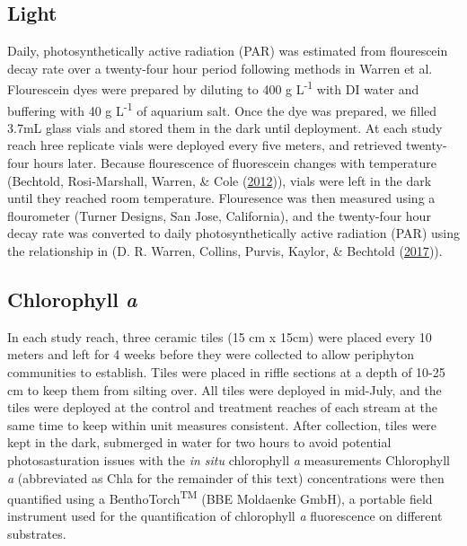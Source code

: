\documentclass[double,12pt]{beavtex}
\begin{document}
  \subsection*{Light}\label{light}
  
  Daily, photosynthetically active radiation (PAR) was estimated from
  flourescein decay rate over a twenty-four hour period following methods
  in Warren et al. Flourescein dyes were prepared by diluting to 400 g
  L\textsuperscript{-1} with DI water and buffering with 40 g
  L\textsuperscript{-1} of aquarium salt. Once the dye was prepared, we
  filled 3.7mL glass vials and stored them in the dark until deployment.
  At each study reach hree replicate vials were deployed every five
  meters, and retrieved twenty-four hours later. Because flourescence of
  fluorescein changes with temperature (Bechtold, Rosi-Marshall, Warren,
  \& Cole (\protect\hyperlink{ref-Bechtold2012}{2012})), vials were left
  in the dark until they reached room temperature. Flouresence was then
  measured using a flourometer (Turner Designs, San Jose, California), and
  the twenty-four hour decay rate was converted to daily
  photosynthetically active radiation (PAR) using the relationship in (D.
  R. Warren, Collins, Purvis, Kaylor, \& Bechtold
  (\protect\hyperlink{ref-Warren2017}{2017})).
  
  \subsection*{\texorpdfstring{Chlorophyll
  \emph{a}}{Chlorophyll a}}\label{chlorophyll-a}
  
  In each study reach, three ceramic tiles (15 cm x 15cm) were placed
  every 10 meters and left for 4 weeks before they were collected to allow
  periphyton communities to establish. Tiles were placed in riffle
  sections at a depth of 10-25 cm to keep them from silting over. All
  tiles were deployed in mid-July, and the tiles were deployed at the
  control and treatment reaches of each stream at the same time to keep
  within unit measures consistent. After collection, tiles were kept in
  the dark, submerged in water for two hours to avoid potential
  photosasturation issues with the \emph{in situ} chlorophyll \emph{a}
  measurements Chlorophyll \emph{a} (abbreviated as Chla for the remainder
  of this text) concentrations were then quantified using a
  BenthoTorch\textsuperscript{TM} (BBE Moldaenke GmbH), a portable field
  instrument used for the quantification of chlorophyll \emph{a}
  fluorescence on different substrates.
  
\end{document}
